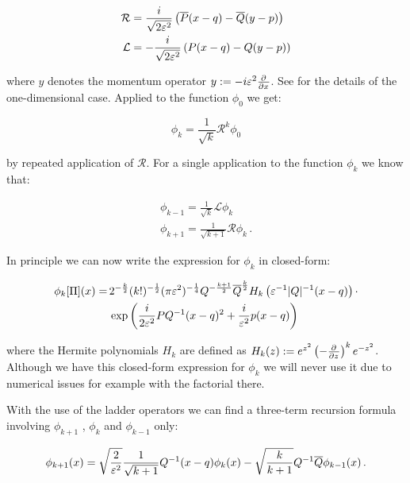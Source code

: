 \begin{align} \label{eq:raising_ops_1d}
  \mathcal{R} & =  \frac{i}{\sqrt{2\varepsilon^2}} \left( \overline{P} (x-q) - \overline{Q} (y-p) \right) \\
  \mathcal{L} & = -\frac{i}{\sqrt{2\varepsilon^2}} \left( P (x-q) - Q (y-p) \right)
\end{align}

where $y$ denotes the momentum operator $y := -i\varepsilon^2 \frac{\partial^{}}{\partial x^{}}$.
See \cite{B_bachelor_thesis} for the details of the one-dimensional case.
Applied to the function $\phi_0$ we get:

\begin{equation}
  \phi_k = \frac{1}{\sqrt{k}} \mathcal{R}^k \phi_0
\end{equation}

by repeated application of $\mathcal{R}$. For a single application to the function
$\phi_k$ we know that:

\begin{align}
  \phi_{k-1} = \frac{1}{\sqrt{k}} \mathcal{L} \phi_k \\
  \phi_{k+1} = \frac{1}{\sqrt{k+1}} \mathcal{R} \phi_k \,.
\end{align}

In principle we can now write the expression for $\phi_k$ in closed-form:

\begin{align*}
  \phi_k[\Pi](x) = \, & 2^{-\frac{k}{2}} (k!)^{-\frac{1}{2}} (\pi\varepsilon^2)^{-\frac{1}{4}}
                     Q^{-\frac{k+1}{2}} \overline{Q}^{\frac{k}{2}}
                     H_k \left(\varepsilon^{-1} |Q|^{-1} (x-q) \right) \cdot \\
                   & \exp \left( \frac{i}{2\varepsilon^2} PQ{}^{-1} (x-q)^2 + \frac{i}{\varepsilon^2} p (x-q) \right)
\end{align*}

where the Hermite polynomials $H_k$ are defined as $H_k(z) := e^{z^2} \left(-\frac{\partial^{}}{\partial z^{}} \right)^k e^{-z^2}$.
Although we have this closed-form expression for $\phi_k$ we will never use it
due to numerical issues for example with the factorial there.

With the use of the ladder operators we can find a three-term recursion formula
involving $\phi_{k+1}$ , $\phi_k$ and $\phi_{k-1}$ only:

\begin{equation}
  \phi_{k+1}(x) = \sqrt{\frac{2}{\varepsilon^2}} \frac{1}{\sqrt{k+1}} Q^{-1} (x-q) \phi_k(x)
                  -\sqrt{\frac{k}{k+1}} Q^{-1} \overline{Q} \phi_{k-1}(x) \,.
\end{equation}

